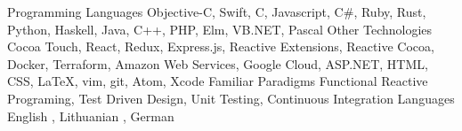 

\begin{cvskills}

  \medskip
  \cvskill
    {Programming Languages} %
    {Objective-C, Swift, C, Javascript, C\#, Ruby, Rust, Python, Haskell, Java, C++, PHP, Elm, VB.NET, Pascal} %
  \medskip
  \cvskill
    {Other Technologies} %
    {Cocoa Touch, React, Redux, Express.js, Reactive Extensions, Reactive Cocoa, Docker, Terraform, Amazon Web Services, Google Cloud, ASP.NET, HTML, CSS, LaTeX, vim, git, Atom, Xcode} %
  \medskip
  \cvskill
    {Familiar Paradigms} %
    {Functional Reactive Programing, Test Driven Design, Unit Testing, Continuous Integration} %
  \medskip
  \cvskill
    {Languages} %
    {English \textit{\color{gray}{(fluent)}}, Lithuanian \textit{\color{gray}{(native)}}, German \textit{\color{gray}{(basic)}}} %
\end{cvskills}
